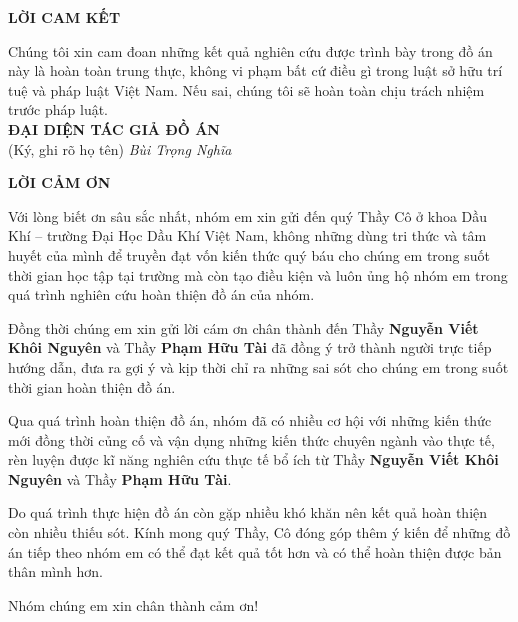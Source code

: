 \documentclass[12pt,a4paper]{report}
\begin{document}
\begin{center}
	\centering
	\textbf{LỜI CAM KẾT}
\end{center}
Chúng tôi xin cam đoan những kết quả nghiên cứu được trình bày trong đồ án này là hoàn toàn trung thực, không vi phạm bất cứ điều gì trong luật sở hữu trí tuệ và pháp luật Việt Nam. Nếu sai, chúng tôi sẽ hoàn toàn chịu trách nhiệm trước pháp luật.\\
\hspace*{250pt} \textbf{ĐẠI DIỆN TÁC GIẢ ĐỒ ÁN}\\
\hspace*{280pt} (Ký, ghi rõ họ tên)
\newline
\newline
\hspace*{282pt} \textit{Bùi Trọng Nghĩa}

\clearpage

\begin{center}
	\centering
	\textbf{LỜI CẢM ƠN}
\end{center}
Với lòng biết ơn sâu sắc nhất, nhóm em xin gửi đến quý Thầy Cô ở khoa Dầu Khí – trường Đại Học Dầu Khí Việt Nam, không những dùng tri thức và tâm huyết của mình để truyền đạt vốn kiến thức quý báu cho chúng em trong suốt thời gian học tập tại trường mà còn tạo điều kiện và luôn ủng hộ nhóm em trong quá trình nghiên cứu hoàn thiện đồ án của nhóm. 

Đồng thời chúng em xin gửi lời cám ơn chân thành đến Thầy \textbf{Nguyễn Viết Khôi Nguyên} và Thầy \textbf{Phạm Hữu Tài} đã đồng ý trở thành người trực tiếp hướng dẫn, đưa ra gợi ý và kịp thời chỉ ra những sai sót cho chúng em trong suốt thời gian hoàn thiện đồ án.

Qua quá trình hoàn thiện đồ án, nhóm đã có nhiều cơ hội với những kiến thức mới đồng thời củng cố và vận dụng những kiến thức chuyên ngành vào thực tế, rèn luyện được kĩ năng nghiên cứu thực tế bổ ích từ Thầy \textbf{Nguyễn Viết Khôi Nguyên} và Thầy \textbf{Phạm Hữu Tài}.

Do quá trình thực hiện đồ án còn gặp nhiều khó khăn nên kết quả hoàn thiện còn nhiều thiếu sót. Kính mong quý Thầy, Cô đóng góp thêm ý kiến để những đồ án tiếp theo nhóm em có thể đạt kết quả tốt hơn và có thể hoàn thiện được bản thân mình hơn.
\begin{flushright}
Nhóm chúng em xin chân thành cảm ơn!
\end{flushright}
\end{document}
